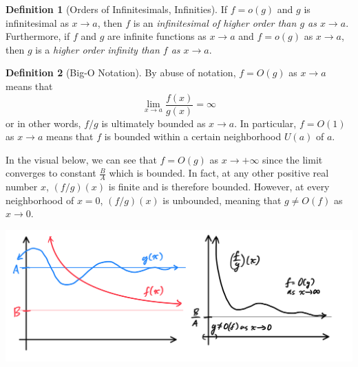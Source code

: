 \documentclass{article}
\theoremstyle{remark}
\theoremstyle{definition}
\newtheorem{definition}{Definition}[section]
\begin{document}
\begin{definition}[Orders of Infinitesimals, Infinities]
If $f = o(g)$ and $g$ is infinitesimal as $x \rightarrow a$, then $f$ is an \textit{infinitesimal of higher order than $g$ as $x \rightarrow a$}. Furthermore, if $f$ and $g$ are infinite functions as $x\rightarrow a$ and $f = o(g)$ as $x \rightarrow a$, then $g$ is a \textit{higher order infinity than $f$ as $x \rightarrow a$}. 
\end{definition}

\begin{definition}[Big-O Notation]
By abuse of notation, $f = O(g)$ as $x \rightarrow a$ means that 
\[\lim_{x \rightarrow a} \frac{f(x)}{g(x)} = \infty\]
or in other words, $f/g$ is ultimately bounded as $x \rightarrow a$. In particular, $f = O(1)$ as $x \rightarrow a$ means that $f$ is bounded within a certain neighborhood $U(a)$ of $a$. 

In the visual below, we can see that $f=O(g)$ as $x \rightarrow +\infty$ since the limit converges to constant $\frac{B}{A}$ which is bounded. In fact, at any other positive real number $x$, $(f/g)(x)$ is finite and is therefore bounded. However, at every neighborhood of $x = 0$, $(f/g)(x)$ is unbounded, meaning that $g \neq O(f)$ as $x \rightarrow 0$. 
\begin{center}
    \includegraphics[scale=0.25]{img/Big_O_Functions.PNG}
\end{center}
\end{definition}
\end{document}
